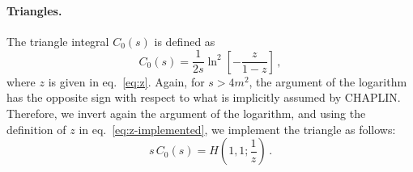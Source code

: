 \documentclass[12pt,a4wide]{article}
\begin{document}
 
\paragraph{Triangles.} The triangle integral $C_0(s)$ is defined as
\begin{equation}
  \label{eq:triangle}
  C_0(s) = \frac{1}{2s}\ln^2\left[-\frac{z}{1-z}\right]\,,
\end{equation}
where $z$ is given in eq.~\eqref{eq:z}. Again, for $s>4m^2$, the argument of the logarithm has the opposite sign with respect to what is implicitly assumed by CHAPLIN. Therefore, we invert again the argument of the logarithm, and using the definition of $z$ in eq.~\eqref{eq:z-implemented}, we implement the triangle as follows:
\begin{equation}
  \label{eq:triangle-HPL}
  s\,C_0(s) = H\left(1,1;\frac{1}{z}\right)\,.
\end{equation}
\end{document}
